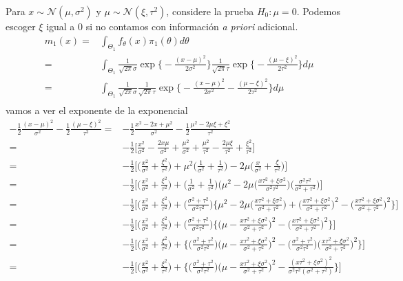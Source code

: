 \documentclass[12pt,]{article}
\begin{document}
Para \(x\sim\mathcal{N}(\mu,\sigma^2)\) y
\(\mu\sim\mathcal{N}(\xi,\tau^2)\), considere la prueba \(H_0:\mu=0\).
Podemos escoger \(\xi\) igual a \(0\) si no contamos con información
\emph{a priori} adicional. \[
\begin{array}{rl}
m_1(x)=&\displaystyle\int_{\Theta_1}f_\theta(x)\pi_1(\theta)d\theta\\
=&\displaystyle\int_{\Theta_1} \frac{1}{\sqrt{2\pi}\sigma}\exp\bigg\{-\frac{(x-\mu)^2}{2\sigma^2}\bigg\}
\frac{1}{\sqrt{2\pi}\tau}\exp\bigg\{-\frac{(\mu-\xi)^2}{2\tau^2}\bigg\}d\mu\\
=&\displaystyle\int_{\Theta_1} \frac{1}{\sqrt{2\pi}\sigma}\frac{1}{\sqrt{2\pi}\tau} \exp\bigg\{-\frac{(x-\mu)^2}{2\sigma^2}-\frac{(\mu-\xi)^2}{2\tau^2}\bigg\}d\mu\\
\end{array}
\] vamos a ver el exponente de la exponencial \[
\begin{array}{rl}
-\frac{1}{2}\frac{(x-\mu)^2}{\sigma^2}-\frac{1}{2}\frac{(\mu-\xi)^2}{\tau^2}=&-\frac{1}{2}\frac{x^2-2x+\mu^2}{\sigma^2}-\frac{1}{2}\frac{\mu^2-2\mu\xi+\xi^2}{\tau^2}\\
=&-\frac{1}{2}\bigg[\frac{x^2}{\sigma^2}-\frac{2x\mu}{\sigma^2}+\frac{\mu^2}{\sigma^2}+\frac{\mu^2}{\tau^2}-\frac{2\mu\xi}{\tau^2}+\frac{\xi^2}{\tau^2}  \bigg]\\
=&-\frac{1}{2}\bigg[\bigg(\frac{x^2}{\sigma^2}+\frac{\xi^2}{\tau^2} \bigg)+\mu^2\bigg(\frac{1}{\sigma^2}+\frac{1}{\tau^2} \bigg) - 2\mu\bigg( \frac{x}{\sigma^2}+\frac{\xi}{\tau^2}  \bigg)  \bigg]\\
=&-\frac{1}{2}\bigg[\bigg(\frac{x^2}{\sigma^2}+\frac{\xi^2}{\tau^2} \bigg)+\bigg(\frac{1}{\sigma^2}+\frac{1}{\tau^2} \bigg)\bigg(\mu^2- 2\mu\bigg( \frac{x\tau^2+\xi\sigma^2}{\sigma^2\tau^2} \bigg)\bigg(\frac{\sigma^2\tau^2}{\sigma^2+\tau^2}\bigg)  \bigg]\\
=&-\frac{1}{2}\bigg[\bigg(\frac{x^2}{\sigma^2}+\frac{\xi^2}{\tau^2} \bigg)+\bigg(\frac{\sigma^2+\tau^2}{\sigma^2\tau^2} \bigg)\bigg\{\mu^2- 2\mu\bigg( \frac{x\tau^2+\xi\sigma^2}{\sigma^2+\tau^2} \bigg) +\bigg( \frac{x\tau^2+\xi\sigma^2}{\sigma^2+\tau^2} \bigg)^2-\bigg( \frac{x\tau^2+\xi\sigma^2}{\sigma^2+\tau^2} \bigg)^2 \bigg\}  \bigg]\\
=&-\frac{1}{2}\bigg[\bigg(\frac{x^2}{\sigma^2}+\frac{\xi^2}{\tau^2} \bigg)+\bigg(\frac{\sigma^2+\tau^2}{\sigma^2\tau^2} \bigg)\bigg\{\bigg(\mu -  \frac{x\tau^2+\xi\sigma^2}{\sigma^2+\tau^2} \bigg)^2-\bigg( \frac{x\tau^2+\xi\sigma^2}{\sigma^2+\tau^2} \bigg)^2 \bigg\}  \bigg]\\
=&-\frac{1}{2}\bigg[\bigg(\frac{x^2}{\sigma^2}+\frac{\xi^2}{\tau^2} \bigg)+\bigg\{\bigg(\frac{\sigma^2+\tau^2}{\sigma^2\tau^2} \bigg)\bigg(\mu -  \frac{x\tau^2+\xi\sigma^2}{\sigma^2+\tau^2} \bigg)^2-\bigg(\frac{\sigma^2+\tau^2}{\sigma^2\tau^2} \bigg)\bigg( \frac{x\tau^2+\xi\sigma^2}{\sigma^2+\tau^2} \bigg)^2 \bigg\}  \bigg]\\
=&-\frac{1}{2}\bigg[\bigg(\frac{x^2}{\sigma^2}+\frac{\xi^2}{\tau^2} \bigg)+\bigg\{\bigg(\frac{\sigma^2+\tau^2}{\sigma^2\tau^2} \bigg)\bigg(\mu -  \frac{x\tau^2+\xi\sigma^2}{\sigma^2+\tau^2} \bigg)^2-
\frac{(x\tau^2+\xi\sigma^2)^2}{\sigma^2\tau^2(\sigma^2+\tau^2)}  \bigg\}  \bigg]\\
\end{array}
\]
\end{document}
